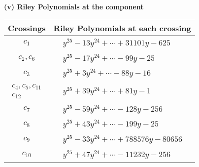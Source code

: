 \documentclass[1p]{elsarticle_modified}
\theoremstyle{definition}
\begin{document}
\newpage\renewcommand{\arraystretch}{1}
\flushleft \textbf{(v) Riley Polynomials at the component}\newline \\
\begin{tabular}{m{50pt}|m{274pt}}
Crossings & \hspace{64pt}Riley Polynomials at each crossing \\
\hline $$\begin{aligned}c_{1}\end{aligned}$$&$\begin{aligned}
&y^{25}-13 y^{24}+\cdots+31101 y-625
\end{aligned}$\\
\hline $$\begin{aligned}c_{2},c_{6}\end{aligned}$$&$\begin{aligned}
&y^{25}-17 y^{24}+\cdots-99 y-25
\end{aligned}$\\
\hline $$\begin{aligned}c_{3}\end{aligned}$$&$\begin{aligned}
&y^{25}+3 y^{24}+\cdots-88 y-16
\end{aligned}$\\
\hline $$\begin{aligned}c_{4},c_{5},c_{11}\\c_{12}\end{aligned}$$&$\begin{aligned}
&y^{25}+39 y^{24}+\cdots+81 y-1
\end{aligned}$\\
\hline $$\begin{aligned}c_{7}\end{aligned}$$&$\begin{aligned}
&y^{25}-59 y^{24}+\cdots-128 y-256
\end{aligned}$\\
\hline $$\begin{aligned}c_{8}\end{aligned}$$&$\begin{aligned}
&y^{25}+43 y^{24}+\cdots-199 y-25
\end{aligned}$\\
\hline $$\begin{aligned}c_{9}\end{aligned}$$&$\begin{aligned}
&y^{25}-33 y^{24}+\cdots+788576 y-80656
\end{aligned}$\\
\hline $$\begin{aligned}c_{10}\end{aligned}$$&$\begin{aligned}
&y^{25}+47 y^{24}+\cdots-11232 y-256
\end{aligned}$\\
\hline
\end{tabular}\\~\\
\end{document}
